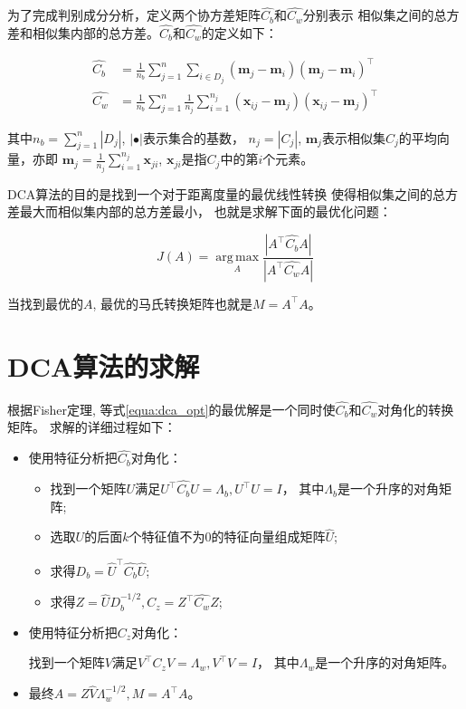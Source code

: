 为了完成判别成分分析，定义两个协方差矩阵$\hat{C_b}$和$\hat{C_w}$分别表示
相似集之间的总方差和相似集内部的总方差。$\hat{C_b}$和$\hat{C_w}$的定义如下：

\begin{align}
    \hat{C_b} &= \frac{1}{n_b} \sum_{j=1}^n \sum_{i \in D_j} (\bm{m}_j - \bm{m}_i)(\bm{m}_j - \bm{m}_i)^\top \\
    \hat{C_w} &= \frac{1}{n_b} \sum_{j=1}^n \frac{1}{n_j} \sum_{i = 1}^{n_j} (\bm{x}_{ij} - \bm{m}_j)(\bm{x}_{ij} - \bm{m}_j)^\top
\end{align}

其中$n_b = \sum_{j=1}^{n}|D_j|$, $|\bullet|$表示集合的基数，
$n_j = |C_j|$,
$\bm{m}_j$表示相似集$C_j$的平均向量，亦即
$\bm{m}_j = \frac{1}{n_j} \sum_{i=1}^{n_j} \bm{x}_{ji}$, 
$\bm{x}_{ji}$是指$C_j$中的第$i$个元素。

DCA算法的目的是找到一个对于距离度量的最优线性转换
使得相似集之间的总方差最大而相似集内部的总方差最小，
也就是求解下面的最优化问题：

\begin{equation}
    \label{equa:dca_opt}
    J(A) = \operatorname*{arg\,max}_A \frac {|A^\top \hat{C_b} A|} {|A^\top \hat{C_w} A|}
\end{equation}

当找到最优的$A$, 最优的马氏转换矩阵也就是$M = A^\top A$。

\section{DCA算法的求解}
\label{sec:algorithm_dca}

根据Fisher定理,
等式\ref{equa:dca_opt}的最优解是一个同时使$\hat{C_b}$和$\hat{C_w}$对角化的转换矩阵。
求解的详细过程如下：

\begin{itemize}
    \item 使用特征分析把$\hat{C_b}$对角化： 
        \begin{itemize}
            \item 找到一个矩阵$U$满足$U^\top \hat{C_b} U = \Lambda_b, U^\top U = I$，
                其中$\Lambda_b$是一个升序的对角矩阵;
            \item 选取$U$的后面$k$个特征值不为$0$的特征向量组成矩阵$\hat{U}$;
            \item 求得$D_b = \hat{U}^\top\hat{C_b}\hat{U}$;
            \item 求得$Z = \hat{U}D_b^{-1/2}, C_z = Z^\top\hat{C_w}Z$;
        \end{itemize}

    \item 使用特征分析把$C_z$对角化： 

        找到一个矩阵$V$满足$V^\top C_z V = \Lambda_w, V^\top V = I$，
                其中$\Lambda_w$是一个升序的对角矩阵。

    \item 最终$A = Z\hat{V}\Lambda_w^{-1/2}, M = A^\top A$。 
        
\end{itemize}

